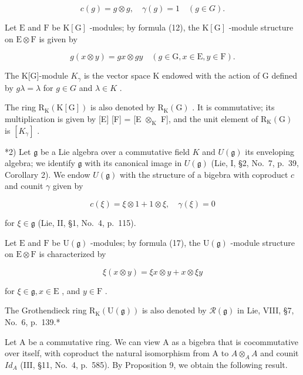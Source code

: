 \[
c (g) = g \otimes g, \quad \gamma (g) = 1 \quad (g \in G).\tag{15}
\]

Let \(\mathrm{E}\) and \(\mathrm{F}\) be \(\mathrm{K}[\mathrm{G}]\) -modules; by formula (12), the \(\mathrm{K}[\mathrm{G}]\) -module structure on \(\mathrm{E} \otimes \mathrm{F}\) is given by

\[
g (x \otimes y) = g x \otimes g y \quad (g \in \mathrm{G}, x \in \mathrm{E}, y \in \mathrm{F}).\tag{16}
\]

The K{[}G{]}-module \(K_{\gamma}\) is the vector space K endowed with the action of G defined by \(g\lambda = \lambda\) for \(g \in G\) and \(\lambda \in K\) .

The ring \(\mathrm{R}_{\mathrm{K}}(\mathrm{K}[\mathrm{G}])\) is also denoted by \(\mathrm{R}_{\mathrm{K}}(\mathrm{G})\) . It is commutative; its multiplication is given by {[}E{]} {[}F{]} = {[}E \(\otimes_{\mathrm{K}}\) F{]}, and the unit element of \(\mathrm{R}_{\mathrm{K}}(\mathrm{G})\) is \([K_{\gamma}]\) .

*2) Let \(\mathfrak{g}\) be a Lie algebra over a commutative field \(K\) and \(U(\mathfrak{g})\) its enveloping algebra; we identify \(\mathfrak{g}\) with its canonical image in \(U(\mathfrak{g})\) (Lie, I, §2, No.~7, p.~39, Corollary 2). We endow \(U(\mathfrak{g})\) with the structure of a bigebra with coproduct \(c\) and counit \(\gamma\) given by

\[
c (\xi) = \xi \otimes 1 + 1 \otimes \xi , \quad \gamma (\xi) = 0\tag{17}
\]

for \(\xi\in\mathfrak{g}\) (Lie, II, §1, No.~4, p.~115).

Let \(\mathrm{E}\) and \(\mathrm{F}\) be \(\mathrm{U}(\mathfrak{g})\) -modules; by formula (17), the \(\mathrm{U}(\mathfrak{g})\) -module structure on \(\mathrm{E} \otimes \mathrm{F}\) is characterized by

\[
\xi (x \otimes y) = \xi x \otimes y + x \otimes \xi y\tag{18}
\]

for \(\xi\in\mathfrak{g}, x\in\mathrm{E}\) , and \(y\in\mathrm{F}\) .

The Grothendieck ring \(\mathrm{R}_{\mathrm{K}}(\mathrm{U}(\mathfrak{g}))\) is also denoted by \(\mathcal{R}(\mathfrak{g})\) in Lie, VIII, §7, No.~6, p.~139.*

Let A be a commutative ring. We can view A as a bigebra that is cocommutative over itself, with coproduct the natural isomorphism from A to \(A \otimes_{A} A\) and counit \(Id_{A}\) (III, §11, No.~4, p.~585). By Proposition 9, we obtain the following result.

